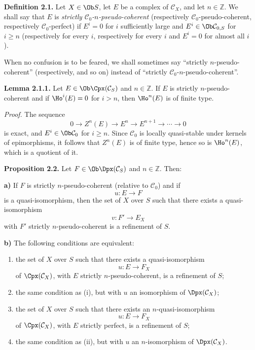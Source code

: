 \documentclass[11pt]{article}
\begin{document}
\textbf{Definition 2.1.} Let \(X\in\Ob S\), let \(E\) be a complex of \(\mathcal C_X\), and let \(n\in\mathbb Z\). We shall say that \(E\) is \emph{strictly \(\mathcal C_0\)-\(n\)-pseudo-coherent} (respectively \(\mathcal C_0\)-pseudo-coherent, respectively \(\mathcal C_0\)-perfect) if \(E^i=0\) for \(i\) sufficiently large and \(E^i\in\Ob\mathcal C_{0,S}\) for \(i\geq n\) (respectively for every \(i\), respectively for every \(i\) and \(E^i=0\) for almost all \(i\)).

When no confusion is to be feared, we shall sometimes say ``strictly \(n\)-pseudo-coherent'' (respectively, and so on) instead of ``strictly \(\mathcal C_0\)-\(n\)-pseudo-coherent''.

\textbf{Lemma 2.1.1.} Let \(E\in\Ob\Cpx(\mathcal C_S)\) and \(n\in\mathbb Z\). If \(E\) is strictly \(n\)-pseudo-coherent and if \(\Ho^i(E)=0\) for \(i>n\), then \(\Ho^n(E)\) is of finite type.

\emph{Proof.} The sequence
\[
  0\longrightarrow Z^n(E)\longrightarrow E^n\longrightarrow E^{n+1}\longrightarrow\cdots\longrightarrow 0
\]
is exact, and \(E^i\in\Ob\mathcal C_0\) for \(i\geq n\). Since \(\mathcal C_0\) is locally quasi-stable under kernels of epimorphisms, it follows that \(Z^n(E)\) is of finite type, hence so is \(\Ho^n(E)\), which is a quotient of it.

\textbf{Proposition 2.2.} Let \(F\in\Ob\Dpx(\mathcal C_S)\) and \(n\in\mathbb Z\). Then:

\textbf{a)} If \(F\) is strictly \(n\)-pseudo-coherent (relative to \(\mathcal C_0\)) and if
\[
  u:E\longrightarrow F
\]
is a quasi-isomorphism, then the set of \(X\) over \(S\) such that there exists a quasi-isomorphism
\[
  v:F'\longrightarrow E_X
\]
with \(F'\) strictly \(n\)-pseudo-coherent is a refinement of \(S\).

\textbf{b)} The following conditions are equivalent:
\begin{enumerate}[label=(\roman*)]
\item the set of \(X\) over \(S\) such that there exists a quasi-isomorphism
\[
  u:E\longrightarrow F_X
\]
of \(\Cpx(\mathcal C_X)\), with \(E\) strictly \(n\)-pseudo-coherent, is a refinement of \(S\);
\item[\((\mathrm{i}')\)] the same condition as (i), but with \(u\) an isomorphism of \(\Dpx(\mathcal C_X)\);
\item the set of \(X\) over \(S\) such that there exists an \(n\)-quasi-isomorphism
\[
  u:E\longrightarrow F_X
\]
of \(\Cpx(\mathcal C_X)\), with \(E\) strictly perfect, is a refinement of \(S\);
\item[\((\mathrm{ii}')\)] the same condition as (ii), but with \(u\) an \(n\)-isomorphism of \(\Dpx(\mathcal C_X)\).
\end{enumerate}
\end{document}
